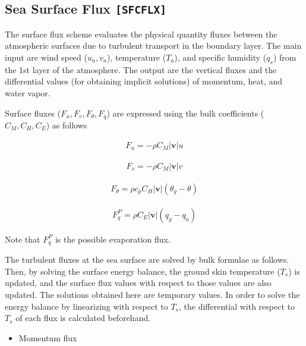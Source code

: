 \hypertarget{sea-surface-flux-sfcflx}{%
\subsection{\texorpdfstring{Sea Surface Flux
\texttt{{[}SFCFLX{]}}}{Sea Surface Flux {[}SFCFLX{]}}}\label{sea-surface-flux-sfcflx}}

The surface flux scheme evaluates the physical quantity fluxes between
the atmospheric surfaces due to turbulent transport in the boundary
layer. The main input are wind speed (\(u_a, v_a\)), temperature
(\(T_a\)), and specific humidity (\(q_s\)) from the 1st layer of the
atmosphere. The output are the vertical fluxes and the differential
values (for obtaining implicit solutions) of momentum, heat, and water
vapor.

Surface fluxes (\(F_u, F_v, F_\theta, F_q\)) are expressed using the
bulk coefficients (\(C_M, C_H, C_E\)) as follows

\begin{eqnarray}
    F_u  =  - \rho C_M |{\mathbf{v}}| u
\end{eqnarray}

\begin{eqnarray}
    F_v  =  - \rho C_M |{\mathbf{v}}| v
\end{eqnarray}

\begin{eqnarray}
    F_\theta  = \rho c_p C_H |{\mathbf{v}}| ( \theta_g - \theta )
\end{eqnarray}

\begin{eqnarray}
    F_q^P =  \rho C_E |{\mathbf{v}}| ( q_g - q_a )
\end{eqnarray}

Note that \(F_q^P\) is the possible evaporation flux.

The turbulent fluxes at the sea surface are solved by bulk formulae as
follows. Then, by solving the surface energy balance, the ground skin
temperature (\(T_s\)) is updated, and the surface flux values with
respect to those values are also updated. The solutions obtained here
are temporary values. In order to solve the energy balance by
linearizing with respect to \(T_s\), the differential with respect to
\(T_s\) of each flux is calculated beforehand.

\begin{itemize}
\tightlist
\item
  Momentum flux
\end{itemize}

